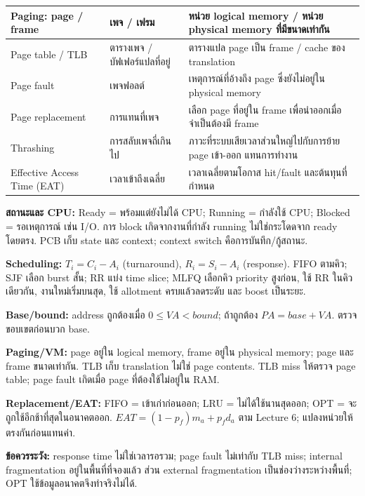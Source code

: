 {\begin{center}
\begin{tabular}{|p{3.5cm}|p{3.6cm}|p{8.1cm}|}
Paging: page / frame & เพจ / เฟรม & หน่วย logical memory / หน่วย physical memory ที่มีขนาดเท่ากัน\\\hline
Page table / TLB & ตารางเพจ / บัฟเฟอร์แปลที่อยู่ & ตารางแปล page เป็น frame / cache ของ translation\\\hline
Page fault & เพจฟอลต์ & เหตุการณ์ที่อ้างถึง page ซึ่งยังไม่อยู่ใน physical memory\\\hline
Page replacement & การแทนที่เพจ & เลือก page ที่อยู่ใน frame เพื่อนำออกเมื่อจำเป็นต้องมี frame\\\hline
Thrashing & การสลับเพจถี่เกินไป & ภาวะที่ระบบเสียเวลาส่วนใหญ่ไปกับการย้าย page เข้า-ออก แทนการทำงาน\\\hline
Effective Access Time (EAT) & เวลาเข้าถึงเฉลี่ย & เวลาเฉลี่ยตามโอกาส hit/fault และต้นทุนที่กำหนด\\\hline
\end{tabular}\end{center}}\par\medskip

{\small
\noindent\textbf{สถานะและ CPU:} Ready = พร้อมแต่ยังไม่ได้ CPU; Running = กำลังใช้ CPU; Blocked = รอเหตุการณ์ เช่น I/O. การ block เกิดจากงานที่กำลัง running ไม่ใช่กระโดดจาก ready โดยตรง. PCB เก็บ state และ context; context switch คือการบันทึก/กู้สถานะ.\par
\noindent\textbf{Scheduling:} $T_i=C_i-A_i$ (turnaround), $R_i=S_i-A_i$ (response). FIFO ตามคิว; SJF เลือก burst สั้น; RR แบ่ง time slice; MLFQ เลือกคิว priority สูงก่อน, ใช้ RR ในคิวเดียวกัน, งานใหม่เริ่มบนสุด, ใช้ allotment ครบแล้วลดระดับ และ boost เป็นระยะ.\par
\noindent\textbf{Base/bound:} address ถูกต้องเมื่อ $0\leq VA<bound$; ถ้าถูกต้อง $PA=base+VA$. ตรวจขอบเขตก่อนบวก base.\par
\noindent\textbf{Paging/VM:} page อยู่ใน logical memory, frame อยู่ใน physical memory; page และ frame ขนาดเท่ากัน. TLB เก็บ translation ไม่ใช่ page contents. TLB miss ให้ตรวจ page table; page fault เกิดเมื่อ page ที่ต้องใช้ไม่อยู่ใน RAM.\par
\noindent\textbf{Replacement/EAT:} FIFO = เข้าเก่าก่อนออก; LRU = ไม่ได้ใช้นานสุดออก; OPT = จะถูกใช้อีกช้าที่สุดในอนาคตออก. $EAT=(1-p_f)m_a+p_f d_a$ ตาม Lecture 6; แปลงหน่วยให้ตรงกันก่อนแทนค่า.\par
\noindent\textbf{ข้อควรระวัง:} response time ไม่ใช่เวลารอรวม; page fault ไม่เท่ากับ TLB miss; internal fragmentation อยู่ในพื้นที่ที่จองแล้ว ส่วน external fragmentation เป็นช่องว่างระหว่างพื้นที่; OPT ใช้ข้อมูลอนาคตจึงทำจริงไม่ได้.\par}

